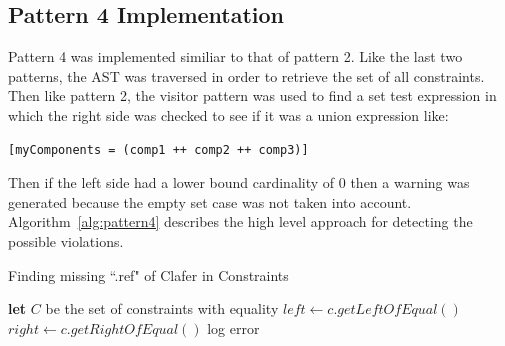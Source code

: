 \documentclass[10pt,oneside]{IEEEtran}
\begin{document}
\subsection{Pattern 4 Implementation}
Pattern 4 was implemented similiar to that of pattern 2. Like the last two patterns, the AST was traversed in order to retrieve the set of all constraints. Then like pattern 2, the visitor pattern was used to find a set test expression in which the right side was checked to see if it was a union expression like:
\begin{lstlisting}[]
[myComponents = (comp1 ++ comp2 ++ comp3)]
\end{lstlisting}
Then if the left side had a lower bound cardinality of 0 then a warning was generated because the empty set case was not taken into account. Algorithm~\ref{alg:pattern4} describes the high level approach for detecting the possible violations.
\begin{algorithm}[H]
\caption{Finding missing ``.ref" of Clafer in Constraints}\label{alg:pattern4}
\begin{algorithmic}[1]
  \State \textbf{let} $C$ be the set of constraints with equality
    \State $left \gets c.getLeftOfEqual()$
    \State $right \gets c.getRightOfEqual()$
        \State log error
      \EndIf
    \EndIf
  \EndFor
\EndProcedure
\end{algorithmic}
\end{algorithm}
\end{document}

